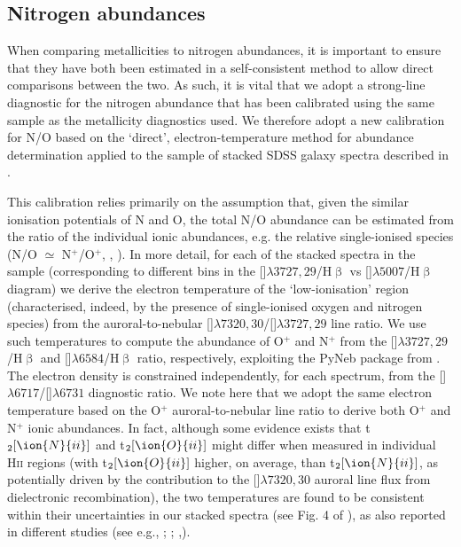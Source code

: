 \documentclass[usenatbib]{mnras} %
\begin{document}
\subsection{Nitrogen abundances} \label{NO_det}

When comparing metallicities to nitrogen abundances, it is important to ensure that they have both been estimated in a self-consistent method to allow direct comparisons between the two. As such, it is vital that we adopt a strong-line diagnostic for the nitrogen abundance that has been calibrated using the same sample as the metallicity diagnostics used. We therefore adopt a new calibration for N/O based on the `direct', electron-temperature method for abundance determination applied to the sample of stacked SDSS galaxy spectra described in \cite{Curti_2017}. 

This calibration relies primarily on the assumption that, given the similar ionisation potentials of N and O, the total N/O abundance can be estimated from the ratio of the individual ionic abundances, e.g. the relative single-ionised species (N/O $\simeq$ N$^+$/O$^+$, \citealt{Garnett_1990}, \citealt{VilaCostas_1993}). 
In more detail, for each of the stacked spectra in the \cite{Curti_2017} sample (corresponding to different bins in the []$\lambda3727,29$/H$\upbeta$ vs []$\lambda5007$/H$\upbeta$ diagram) we derive the electron temperature of the `low-ionisation' region (characterised, indeed, by the presence of single-ionised oxygen and nitrogen species) from the auroral-to-nebular []$\lambda7320,30$/[]$\lambda3727,29$ line ratio. We use such temperatures to compute the abundance of O$^{+}$ and N$^{+}$ from the []$\lambda3727,29$/H$\upbeta$ and []$\lambda6584$/H$\upbeta$ ratio, respectively, exploiting the PyNeb package from \cite{Luridiana_2015}. The electron density is constrained independently, for each spectrum, from the []$\lambda6717$/[]$\lambda6731$
diagnostic ratio.
We note here that we adopt the same electron temperature based on the O$^{+}$ auroral-to-nebular line ratio to derive both O$^{+}$ and N$^{+}$ ionic abundances. 
In fact, although some evidence exists that t$_{2}[\ion{N}{ii}]$ and t$_{2}[\ion{O}{ii}]$ might differ when measured in individual \textsc{Hii} regions (with t$_{2}[\ion{O}{ii}]$ higher, on average, than t$_{2}[\ion{N}{ii}]$, as potentially driven by the contribution to the []$\lambda7320,30$ auroral line flux from dielectronic recombination), the two temperatures are found to be consistent within their uncertainties in our stacked spectra (see Fig. 4 of \citealt{Curti_2017}), as also reported in different studies (see e.g., \citealt{Esteban_2009}; \citealt{Pilyugin_2009}; \citealt{Berg_2015},\citeyear{Berg_2020}).
\end{document}

